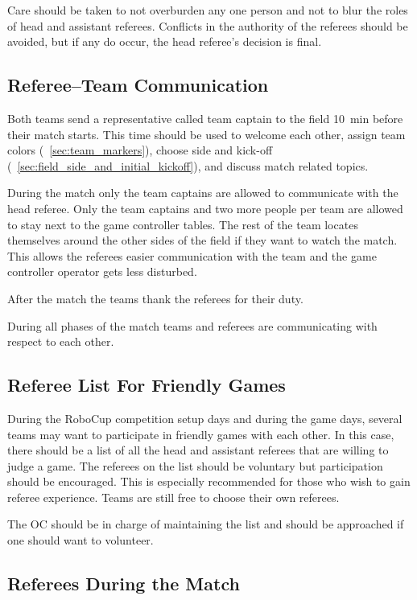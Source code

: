 Care should be taken to not overburden any one person and not to blur the roles
of head and assistant referees. Conflicts in the authority of the referees should
be avoided, but if any do occur, the head referee's decision is final.

\subsection{Referee--Team Communication}
\label{sec:referee_team_communication}

Both teams send a representative called team captain to the field \qty{10}{\minute} before their match starts.
This time should be used to welcome each other, assign team colors (\cf~\cref{sec:team_markers}), choose side and kick-off (\cf~\cref{sec:field_side_and_initial_kickoff}), and discuss match related topics.

During the match only the team captains are allowed to communicate with the head referee.
Only the team captains and two more people per team are allowed to stay next to the game controller tables.
The rest of the team locates themselves around the other sides of the field if they want to watch the match.
This allows the referees easier communication with the team and the game controller operator gets less disturbed.

After the match the teams thank the referees for their duty.

During all phases of the match teams and referees are communicating with respect to each other.

\subsection{Referee List For Friendly Games}
\label{sec:referee_list}

During the RoboCup competition setup days and during the game days, several teams may want to participate in friendly games with each other.
In this case, there should be a list of all the head and assistant referees that are willing to judge a game.
The referees on the list should be voluntary but participation should be encouraged.
This is especially recommended for those who wish to gain referee experience.
Teams are still free to choose their own referees.

The OC should be in charge of maintaining the list and should be approached if one should want to volunteer.

\subsection{Referees During the Match}
\label{sec:referee_during_match}

